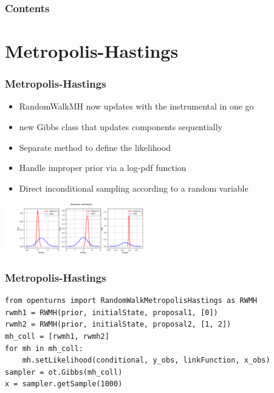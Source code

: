 \documentclass[aspectratio=169]{beamer}
\begin{document}



\begin{frame}
\frametitle{Contents}
\tableofcontents
\end{frame}

\section{Metropolis-Hastings}
% 
\begin{frame}[containsverbatim]
\frametitle{Metropolis-Hastings}

\begin{itemize}
\item RandomWalkMH now updates with the instrumental in one go
\item new Gibbs class that updates components sequentially
\item Separate method to define the likelihood
\item Handle improper prior via a log-pdf function
\item Direct inconditional sampling according to a random variable
\end{itemize}

 
\begin{center}
\includegraphics[width=0.5\textwidth]{figures/sphx_glr_plot_bayesian_calibration_002.png}
\end{center}
\end{frame}

\begin{frame}[containsverbatim]
\frametitle{Metropolis-Hastings}

\lstset{language=python}
\begin{lstlisting}
from openturns import RandomWalkMetropolisHastings as RWMH
rwmh1 = RWMH(prior, initialState, proposal1, [0])
rwmh2 = RWMH(prior, initialState, proposal2, [1, 2])
mh_coll = [rwmh1, rwmh2]
for mh in mh_coll:
    mh.setLikelihood(conditional, y_obs, linkFunction, x_obs)
sampler = ot.Gibbs(mh_coll)
x = sampler.getSample(1000)
\end{lstlisting}


\end{frame}
\end{document}

